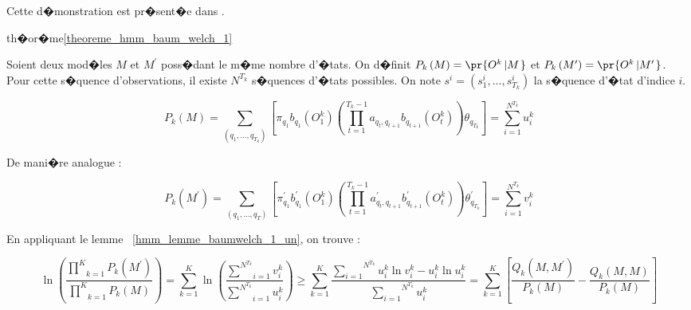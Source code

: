 Cette d�monstration est pr�sent�e dans .


\begin{xdemo}{th�or�me}{\ref{theoreme_hmm_baum_welch_1}}


Soient deux mod�les $M$ et $M^{\prime}$ poss�dant le m�me nombre d'�tats. On d�finit $P_{k}\left( M\right)  = \pr{   O^{k}\left|  M\right. } $ et $P_{k}\left( M^{\prime}\right)  = \pr{  O^{k}\left|  M^{\prime}\right.  }$. Pour cette s�quence d'observations, il existe $N^{T_{k}}$ s�quences d'�tats possibles. On note $s^{i}=\left(  s_{1}^{i},...,s_{T_{k}}%
^{i}\right)  $ la s�quence d'�tat d'indice $i$.

        $$
        P_{k}\left(  M\right)  =\underset{\left(  q_{1},...,q_{T_{k}}\right)}{\overset{}{{\displaystyle\sum}}}\left[
         \pi_{q_{1}}b_{q_{1}}\left(
        O_{1}^{k}\right)  \left(  \underset {t=1}{\overset{T_{k}-1}
                {\prod}}a_{q_{t},q_{t+1}}b_{q_{t+1}}\left(  O_{t} ^{k}\right)  \right)
        \theta_{q_{T_{k}}}\right]  =\underset{i=1} {\overset{N^{T_{k}}}{ {\displaystyle\sum}}}u_{i}^{k}
        $$

De mani�re analogue :

        $$
        P_{k}\left(  M^{\prime}\right)  =\underset{\left(q_{1},...,q_{T}\right)  }
        {\overset{}{{\displaystyle\sum} }}\left[
        \pi_{q_{1}}^{\prime}b_{q_{1}}^{\prime}\left(  O_{1}^{k}\right) \left(
         \underset{t=1}{\overset{T_{k}-1}{\prod}}a_{q_{t},q_{t+1}}^{\prime
        }b_{q_{t+1}}^{\prime}\left(  O_{t}^{k}\right)  \right) 
                 \theta_{q_{T_{k}} }^{\prime}\right]  =\underset{i=1}{\overset{N^{T_{k}}}{
        {\displaystyle\sum} }}v_{i}^{k}
        $$

En appliquant le lemme ~\ref{hmm_lemme_baumwelch_1_un}, on trouve :

        $$
        \ln\left(  \dfrac{\underset{k=1}{\overset{K}{\prod}}P_{k}\left(  M^{\prime }\right) 
         }{\underset{k=1}{\overset{K}{\prod}}P_{k}\left(  M\right)
        }\right)=\underset{k=1}{\overset{K}{\sum}}\ln\left(  \frac{\underset{i=1}
        {\overset{N^{T_{k}}}{ {\displaystyle\sum}
        }}v_{i}^{k}}{\underset{i=1}{\overset{N^{T_{k}}}{ {\displaystyle\sum} }}u_{i}^{k}}\right) 
         \geqslant\underset{k=1}{\overset{K}{\sum}}\dfrac
        {\overset{N^{T_{k}}}{\underset{i=1}{\sum}}u_{i}^{k}\ln v_{i}^{k}-u_{i}^{k}\ln
        u_{i}^{k}}{\overset{N^{T_{k}}}{\underset{i=1}{\sum}}u_{i}^{k}}=\underset {k=1}
        {\overset{K}{\sum}}\left[  \dfrac{Q_{k}\left(
         M,M^{\prime}\right)
        }{P_{k}\left(  M\right)  }-\frac{Q_{k}\left(  M,M\right)  }{P_{k}\left( M\right)  }\right]
        $$


\end{xdemo}
